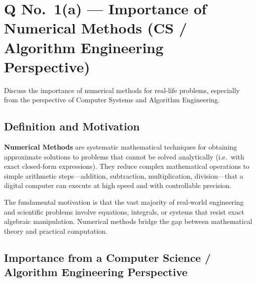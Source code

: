 \documentclass[12pt]{article}
\begin{document}
\vspace{6pt}

\section{Q No.\ 1(a) --- Importance of Numerical Methods (CS / Algorithm Engineering Perspective)}

\begin{problembox}
Discuss the importance of numerical methods for real-life problems, especially from the perspective of Computer Systems and Algorithm Engineering.
\end{problembox}

\subsection*{Definition and Motivation}

\begin{conceptbox}
\textbf{Numerical Methods} are systematic mathematical techniques for obtaining approximate solutions to problems that cannot be solved analytically (i.e.\ with exact closed-form expressions). They reduce complex mathematical operations to simple arithmetic steps---addition, subtraction, multiplication, division---that a digital computer can execute at high speed and with controllable precision.

The fundamental motivation is that the vast majority of real-world engineering and scientific problems involve equations, integrals, or systems that resist exact algebraic manipulation. Numerical methods bridge the gap between mathematical theory and practical computation.
\end{conceptbox}

\vspace{8pt}
\subsection*{Importance from a Computer Science / Algorithm Engineering Perspective}
\end{document}
